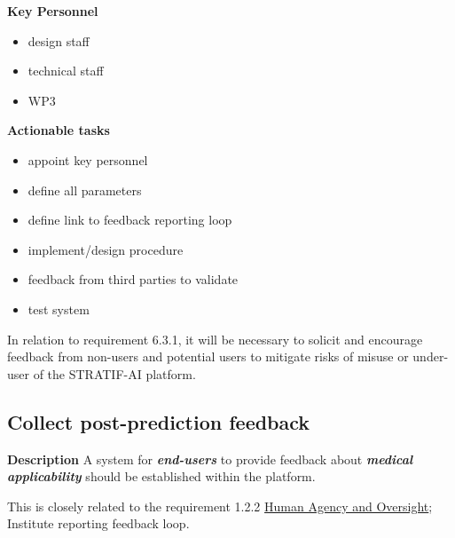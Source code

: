 \documentclass[
  letterpaper,
  DIV=11,
  numbers=noendperiod]{scrreport}
\providecommand{\tightlist}{%
  \setlength{\itemsep}{0pt}\setlength{\parskip}{0pt}}\usepackage{longtable,booktabs,array}
\begin{document}
\textbf{Key Personnel}

\begin{itemize}
\tightlist
\item
  design staff
\item
  technical staff
\item
  WP3
\end{itemize}

\textbf{Actionable tasks}

\begin{itemize}
\tightlist
\item
  appoint key personnel
\item
  define all parameters
\item
  define link to feedback reporting loop
\item
  implement/design procedure
\item
  feedback from third parties to validate
\item
  test system
\end{itemize}

\begin{tcolorbox}[enhanced jigsaw, arc=.35mm, breakable, coltitle=black, toptitle=1mm, colbacktitle=quarto-callout-note-color!10!white, toprule=.15mm, left=2mm, bottomrule=.15mm, opacitybacktitle=0.6, titlerule=0mm, colback=white, opacityback=0, title=\textcolor{quarto-callout-note-color}{\faInfo}\hspace{0.5em}{Note}, bottomtitle=1mm, colframe=quarto-callout-note-color-frame, leftrule=.75mm, rightrule=.15mm]

In relation to requirement 6.3.1, it will be necessary to solicit and
encourage feedback from non-users and potential users to mitigate risks
of misuse or under-user of the STRATIF-AI platform.

\end{tcolorbox}

\hypertarget{collect-post-prediction-feedback}{%
\subsection{Collect post-prediction
feedback}\label{collect-post-prediction-feedback}}

\textbf{Description} A system for \textbf{\emph{end-users}} to provide
feedback about \textbf{\emph{medical applicability}} should be
established within the platform.

\begin{tcolorbox}[enhanced jigsaw, arc=.35mm, breakable, coltitle=black, toptitle=1mm, colbacktitle=quarto-callout-note-color!10!white, toprule=.15mm, left=2mm, bottomrule=.15mm, opacitybacktitle=0.6, titlerule=0mm, colback=white, opacityback=0, title=\textcolor{quarto-callout-note-color}{\faInfo}\hspace{0.5em}{Note}, bottomtitle=1mm, colframe=quarto-callout-note-color-frame, leftrule=.75mm, rightrule=.15mm]

This is closely related to the requirement 1.2.2
\protect\hyperlink{human-agency-and-oversight}{Human Agency and
Oversight}; Institute reporting feedback loop.

\end{tcolorbox}
\end{document}
